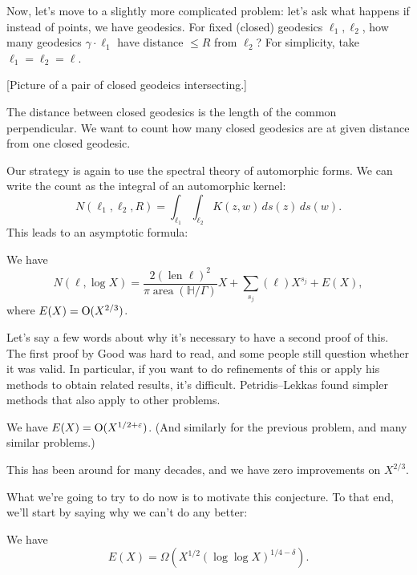 \documentclass[reqno]{amsart} 
\begin{document}
Now, let's move to a slightly more complicated problem: let's ask what happens if instead of points, we have geodesics.  For fixed (closed) geodesics $\ell_1, \ell_2$, how many geodesics $\gamma \cdot \ell_1$ have distance $\leq R$ from $\ell_2$?  For simplicity, take $\ell_1 = \ell_2 = \ell$.

[Picture of a pair of closed geodeics intersecting.]

The distance between closed geodesics is the length of the common perpendicular.  We want to count how many closed geodesics are at given distance from one closed geodesic.

Our strategy is again to use the spectral theory of automorphic forms.  We can write the count as the integral of an automorphic kernel:
\begin{equation*}
  N(\ell_1, \ell_2, R) = \int_{\ell_1} \int_{\ell_2}
  K(z, w)
  \, d s(z)
  \, d s(w).
\end{equation*}
This leads to an asymptotic formula:
\begin{theorem}
  We have
  \begin{equation*}
    N(\ell, \log X)
    = \frac{2(\operatorname{len} \ell)^2}{\pi \operatorname{area}(\mathbb{H} / \Gamma)} X
    + \sum_{s_j}(\ell) X^{s_j} + E(X),
  \end{equation*}
  where $E(X) = \operatorname{O}(X^{2/3})$.
\end{theorem}

Let's say a few words about why it's necessary to have a second proof of this.  The first proof by Good was hard to read, and some people still question whether it was valid.  In particular, if you want to do refinements of this or apply his methods to obtain related results, it's difficult.  Petridis--Lekkas found simpler methods that also apply to other problems.

\begin{conjecture}
  We have $E(X) = \operatorname{O}(X^{1/2 + \varepsilon})$.  (And similarly for the previous problem, and many similar problems.)
\end{conjecture}

This has been around for many decades, and we have zero improvements on $X^{2/3}$.

What we're going to try to do now is to motivate this conjecture.  To that end, we'll start by saying why we can't do any better:
\begin{theorem}[V.\ 2024]
  We  have
  \begin{equation*}
    E(X) = \Omega \left( X^{1/2}(\log \log X)^{1/4 - \delta} \right).
  \end{equation*}  
\end{theorem}
\end{document}
